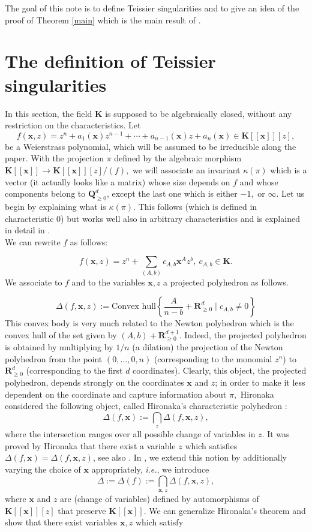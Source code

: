 \documentclass[11pt, a4paper]{amsart}
\numberwithin{equation}{section}
\theoremstyle{plain}
\theoremstyle{definition}
\theoremstyle{remark}
\newcommand{\IQ}{\mathbf{Q}}
\newcommand{\K}{\mathbf{K}}
\newcommand{\0}{{\boldsymbol 0}}
\newcommand{\x}{{\boldsymbol x}}
\begin{document}
The goal of this note is to define Teissier singularities and to give an idea of the proof 
of Theorem \ref{main} which is the main result of \cite{MS1}.

\smallskip

\section{The definition of Teissier singularities}

In this section, the field $\K$ is supposed to be algebraically closed, without any restriction on the characteristics. Let  
\[f(\x,z)=z^n+a_1(\x)z^{n-1}+\cdots + a_{n-1}(\x)z+a_{n}(\x) \in \K[[\x]][z],\]
be a Weierstrass polynomial, which will be assumed to be irreducible along the paper. With the projection $\pi$ defined by the algebraic morphism $\K[[\x]]\longrightarrow \K[[\x]][z]/(f),$ we will associate an invariant
$\kappa(\pi)$ which is a vector (it actually looks like a matrix) whose size depends on $f$ and whose components belong to $\IQ_{\geq 0}^d$, except the last one which is either $-1,$ or $\infty.$ Let us begin by explaining what is $\kappa(\pi).$ This follows \cite{MS} (which is defined in characteristic $0$)  but works well also in arbitrary characteristics and is explained in detail in \cite{MS1}.\\

We can rewrite $f$  as follows:

$$f(\x,z)=z^n+\sum_{(A,b)} c_{A,b}\x^Az^b,~ c_{A,b} \in \mathbf{K}.$$
We associate to $f$ and to the variables $\x,z$ a projected polyhedron as follows.

$$\Delta(f,\x,z):=\mbox{Convex hull}\left\{\frac{A}{n-b}+
\mathbf{R}_{\geq 0}^d\mid c_{A,b}\not=0\right\}$$
This convex body is very much related to the Newton polyhedron
which is the convex hull of the set given by $ (A,b) + \mathbf{R}_{\geq 0}^{d+1}.$ Indeed, the projected polyhedron is obtained by multiplying by $1/n$ (a dilation)  the projection of the Newton polyhedron from the point $(0,\ldots,0,n)$ (corresponding to the monomial $z^n$) to  $\mathbf{R}_{\geq 0}^d$ (corresponding to the first $d$ coordinates). Clearly, this object, the projected polyhedron, depends strongly on the coordinates $\x$ and $z$; in order to make it less dependent on the coordinate and capture information about $\pi,$ Hironaka considered the following object, called Hironaka’s characteristic polyhedron \cite{HiroPoly}:
$$\Delta(f,\x):=\bigcap_z \Delta(f,\x,z),$$
where the intersection ranges over all possible change of variables in $ z $.
	It was proved by Hironaka \cite{HiroPoly} that there exist a variable $z$ which satisfies
	$\Delta(f,\x)= \Delta(f,\x,z) $, see also \cite{CPcompl}.
	In \cite{MS}, we extend this notion by additionally varying the choice of $ \x $ appropriately, \textit{i.e.}, we introduce
$$\Delta := \Delta (f ) := \bigcap_{\x,z} \Delta(f,\x,z),$$
where $\x$ and $z$ are (change of variables) defined by automorphisms
of $\K[[\x]][z]$ that preserve $\K[[\x]].$  
We can generalize Hironaka's theorem and show that there exist variables $\x,z$ which satisfy
\end{document}
